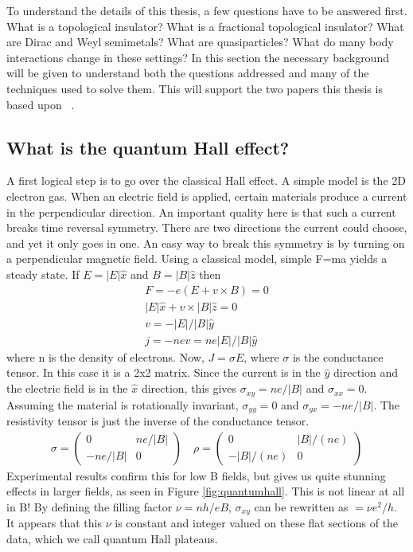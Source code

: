 To understand the details of this thesis, a few questions have to be answered first. What is a topological insulator? What is a fractional topological insulator? What are Dirac and Weyl semimetals? What are quasiparticles? What do many body interactions change in these settings? In this section the necessary background will be given to understand both the questions addressed and many of the techniques used to solve them. This will support the two papers this thesis is based upon ~\cite{SahooSirotaChoTeo17,RazaSirotaTeo17}.

\subsection{What is the quantum Hall effect?}

A first logical step is to go over the classical Hall effect. A simple model is the 2D electron gas. When an electric field is applied, certain materials produce a current in the perpendicular direction. An important quality here is that such a current breaks time reversal symmetry. There are two directions the current could choose, and yet it only goes in one. An easy way to break this symmetry is by turning on a perpendicular magnetic field. Using a classical model, simple F=ma yields a steady state. If $E=|E|\hat{x}$ and $B=|B|\hat{z}$ then
\begin{align}
F = -e(E+v \times B) = 0 \\
|E|\hat{x} + v \times |B| \hat{z} =0 \\
v = -|E|/|B| \hat{y}\\
j = -nev = ne|E|/|B| \hat{y}
\end{align}
where n is the density of electrons. Now, $J= \sigma E$, where $\sigma$ is the conductance tensor. In this case it is a 2x2 matrix. Since the current is in the $\hat{y}$ direction and the electric field is in the $\hat{x}$ direction, this gives $\sigma_{xy}= ne/|B| $ and $\sigma_{xx}= 0 $. Assuming the material is rotationally invariant, $\sigma_{yy}= 0 $ and $\sigma_{yx}= -ne/|B| $. The resistivity tensor is just the inverse of the conductance tensor.
\begin{align}
\sigma = 
\begin{pmatrix}
0 & ne/|B| \\
-ne/|B| & 0
\end{pmatrix} \quad 
\rho = 
\begin{pmatrix}
0 & |B|/(ne) \\
-|B|/(ne) & 0
\end{pmatrix}
\end{align}
Experimental results confirm this for low B fields, but gives us quite stunning effects in larger fields, as seen in Figure \ref{fig:quantumhall}. This is not linear at all in B! By defining the filling factor $\nu=nh/eB$, $\sigma_{xy}$ can be rewritten as $ = \nu e^2/h$. It appears that this $\nu$ is constant and integer valued on these flat sections of the data, which we call quantum Hall plateaus. 

